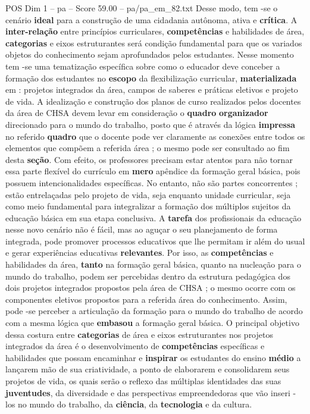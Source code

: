 \begin{textsample}{POS Dim 1 – pa – Score 59.00 – pa/pa\_em\_82.txt}
Desse modo, tem -se o cenário \textbf{ideal} para a construção de uma cidadania autônoma, ativa e \textbf{crítica}.
A \textbf{inter-relação} entre princípios curriculares, \textbf{competências} e habilidades de área, \textbf{categorias} e eixos estruturantes será condição fundamental para que os variados objetos do conhecimento sejam aprofundados pelos estudantes.
Nesse momento tem -se uma tematização específica sobre como o educador deve conceber a formação dos estudantes no \textbf{escopo} da flexibilização curricular, \textbf{materializada} em : projetos integrados da área, campos de saberes e práticas eletivos e projeto de vida.
A idealização e construção dos planos de curso realizados pelos docentes da área de CHSA devem levar em consideração o \textbf{quadro} \textbf{organizador} direcionado para o mundo do trabalho, posto que é através da lógica \textbf{impressa} no referido \textbf{quadro} que o docente pode ver claramente as conexões entre todos os elementos que compõem a referida área ; o mesmo pode ser consultado ao fim desta \textbf{seção}.
Com efeito, os professores precisam estar atentos para não tornar essa parte flexível do currículo em \textbf{mero} apêndice da formação geral básica, pois possuem intencionalidades específicas.
No entanto, não são partes concorrentes ; estão entrelaçadas pelo projeto de vida, seja enquanto unidade curricular, seja como meio fundamental para integralizar a formação dos múltiplos sujeitos da educação básica em sua etapa conclusiva.
A \textbf{tarefa} dos profissionais da educação nesse novo cenário não é fácil, mas ao aguçar o seu planejamento de forma integrada, pode promover processos educativos que lhe permitam ir além do usual e gerar experiências educativas \textbf{relevantes}.
Por isso, as \textbf{competências} e habilidades da área, \textbf{tanto} na formação geral básica, quanto na nucleação para o mundo do trabalho, podem ser percebidas dentro da estrutura pedagógica dos dois projetos integrados propostos pela área de CHSA ; o mesmo ocorre com os componentes eletivos propostos para a referida área do conhecimento.
Assim, pode -se perceber a articulação da formação para o mundo do trabalho de acordo com a mesma lógica que \textbf{embasou} a formação geral básica.
O principal objetivo dessa costura entre \textbf{categorias} de área e eixos estruturantes nos projetos integrados da área é o desenvolvimento de \textbf{competências} específicas e habilidades que possam encaminhar e \textbf{inspirar} os estudantes do ensino \textbf{médio} a lançarem mão de sua criatividade, a ponto de elaborarem e consolidarem seus projetos de vida, os quais serão o reflexo das múltiplas identidades das suas \textbf{juventudes}, da diversidade e das perspectivas empreendedoras que vão inseri -los no mundo do trabalho, da \textbf{ciência}, da \textbf{tecnologia} e da cultura.

\end{textsample}

